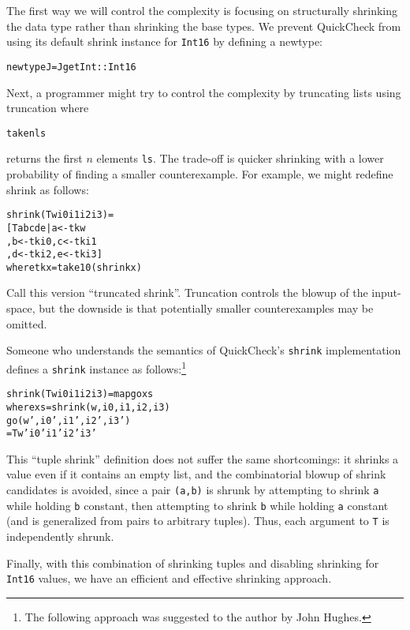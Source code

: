 \documentclass{sigplanconf}
\newenvironment{code}{\begin{alltt}\footnotesize}{\end{alltt}}
\newcommand{\ttp}[1]{\texttt{#1}}
\begin{document}
The first way we will control the complexity is focusing on structurally
shrinking the data type rather than shrinking the base types.  We prevent
QuickCheck from using its default shrink instance for \ttp{Int16} by defining a
newtype:
%
\begin{code}
newtype J = J { getInt :: Int16 }
\end{code}
%
\noindent
Next, a programmer might try to control the complexity by truncating lists using
truncation where
%
\begin{code}
take n ls
\end{code}
%
returns the first $n$ elements \ttp{ls}.  The trade-off is quicker shrinking
with a lower probability of finding a smaller counterexample.  For example, we
might redefine shrink as follows:
%
\begin{samepage}
\begin{code}
shrink (T w i0 i1 i2 i3) =
  [ T a b c d e | a <- tk w
                , b <- tk i0, c <- tk i1
                , d <- tk i2, e <- tk i3 ]
  where tk x = take 10 (shrink x)
\end{code}
\end{samepage}
%
\noindent
Call this version ``truncated shrink''.  Truncation controls the blowup of the
input-space, but the downside is that potentially smaller counterexamples may be
omitted.

Someone who understands the semantics of QuickCheck's \ttp{shrink}
implementation defines a \ttp{shrink} instance as follows:\footnote{The
  following approach was suggested to the author by John Hughes.}
%
\begin{code}
shrink (T w i0 i1 i2 i3) = map go xs
  where xs = shrink (w, i0, i1, i2, i3)
        go (w', i0', i1', i2', i3')
           = T w' i0' i1' i2' i3'
\end{code}
%
\noindent
This ``tuple shrink'' definition does not suffer the same shortcomings: it
shrinks a value even if it contains an empty list, and the combinatorial blowup
of shrink candidates is avoided, since a pair \ttp{(a,b)} is shrunk by
attempting to shrink \ttp{a} while holding \ttp{b} constant, then attempting to
shrink \ttp{b} while holding \ttp{a} constant (and is generalized from pairs to
arbitrary tuples).  Thus, each argument to \ttp{T} is independently shrunk.

Finally, with this combination of shrinking tuples and disabling shrinking for
\ttp{Int16} values, we have an efficient and effective shrinking approach.


\end{document}
